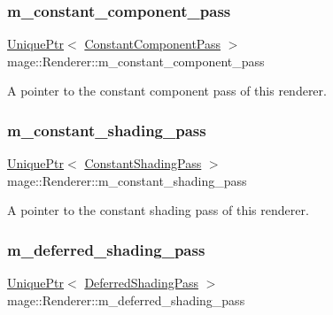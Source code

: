 \subsubsection{\texorpdfstring{m\+\_\+constant\+\_\+component\+\_\+pass}{m\_constant\_component\_pass}}
{\footnotesize\ttfamily \hyperlink{namespacemage_a3316d7143a973e37adf1110f2e80ca31}{Unique\+Ptr}$<$ \hyperlink{classmage_1_1_constant_component_pass}{Constant\+Component\+Pass} $>$ mage\+::\+Renderer\+::m\+\_\+constant\+\_\+component\+\_\+pass\hspace{0.3cm}{\ttfamily [private]}}

A pointer to the constant component pass of this renderer. \hypertarget{classmage_1_1_renderer_af6536c9471209a50c8630e0b49a45177}{}\label{classmage_1_1_renderer_af6536c9471209a50c8630e0b49a45177} 
\subsubsection{\texorpdfstring{m\+\_\+constant\+\_\+shading\+\_\+pass}{m\_constant\_shading\_pass}}
{\footnotesize\ttfamily \hyperlink{namespacemage_a3316d7143a973e37adf1110f2e80ca31}{Unique\+Ptr}$<$ \hyperlink{classmage_1_1_constant_shading_pass}{Constant\+Shading\+Pass} $>$ mage\+::\+Renderer\+::m\+\_\+constant\+\_\+shading\+\_\+pass\hspace{0.3cm}{\ttfamily [private]}}

A pointer to the constant shading pass of this renderer. \hypertarget{classmage_1_1_renderer_a0179c9a4fe8b2c6d090a96adc94383b0}{}\label{classmage_1_1_renderer_a0179c9a4fe8b2c6d090a96adc94383b0} 
\subsubsection{\texorpdfstring{m\+\_\+deferred\+\_\+shading\+\_\+pass}{m\_deferred\_shading\_pass}}
{\footnotesize\ttfamily \hyperlink{namespacemage_a3316d7143a973e37adf1110f2e80ca31}{Unique\+Ptr}$<$ \hyperlink{classmage_1_1_deferred_shading_pass}{Deferred\+Shading\+Pass} $>$ mage\+::\+Renderer\+::m\+\_\+deferred\+\_\+shading\+\_\+pass\hspace{0.3cm}{\ttfamily [private]}}

